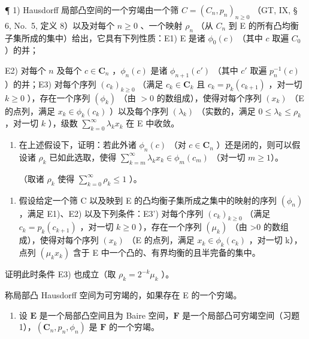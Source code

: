 \exercisegroup

¶ 1) Hausdorff 局部凸空间的一个穷竭由一个筛 \(C = (C_n, p_n)_{n \geqslant 0}\) （GT, IX, § 6, No.~5, 定义 8）以及对每个 \(n \geqslant 0\) 、一个映射 \(\rho_n\) （从 \(C_n\) 到 E 的所有凸均衡子集所成的集中）给出，它具有下列性质：E1) E 是诸 \(\phi_0(c)\) （其中 \(c\) 取遍 \(C_0\) ）的并；

E2) 对每个 \(n\) 及每个 \(c \in \mathbf{C}_n\) ，\(\phi_n(c)\) 是诸 \(\phi_{n+1}(c')\) （其中 \(c'\) 取遍 \(p_n^{-1}(c)\) ）的并；E3) 对每个序列 \((c_k)_{k \geqslant 0}\) （满足 \(c_k \in \mathbf{C}_k\) 且 \(c_k = p_k(c_{k+1})\) ，对一切 \(k \geqslant 0\) ），存在一个序列 \((\phi_k)\) （由 \(>0\) 的数组成），使得对每个序列 \((x_k)\) （E 的点列，满足 \(x_k \in \phi_k(c_k)\) ）以及每个序列 \((\lambda_k)\) （实数的，满足 \(0 \leqslant \lambda_k \leqslant \rho_k\) ，对一切 \(k\) ），级数 \(\sum_{k=0}^{\infty} \lambda_k x_k\) 在 E 中收敛。

\begin{enumerate}
\def\labelenumi{\alph{enumi})}
\tightlist
\item
  在上述假设下，证明：若此外诸 \(\phi_n(c)\) （对 \(c \in \mathbf{C}_n\) ）还是闭的，则可以假设诸 \(\rho_k\) 已如此选取，使得 \(\sum_{k=m}^{\infty} \lambda_k x_k \in \phi_m(c_m)\) （对一切 \(m \geqslant 1\)）。

（取诸 \(\rho_{k}\) 使得 \(\sum_{k=0}^{\infty} \rho_{k} \leqslant 1\) ）。
\end{enumerate}

\begin{enumerate}
\def\labelenumi{\alph{enumi})}
\setcounter{enumi}{1}
\tightlist
\item
  假设给定一个筛 C 以及映到 E 的凸均衡子集所成之集中的映射的序列 \((\phi_{n})\) ，满足 E1)、E2) 以及下列条件：E3') 对每个序列 \((c_{k})_{k\geq0}\) （满足 \(c_{k}=p_{k}(c_{k+1})\) ，对一切 \(k\geq0\) ），存在一个序列 \((\mu_{k})\) （由 \textgreater0 的数组成），使得对每个序列 \((x_{k})\) （E 的点列，满足 \(x_{k}\in\phi_{k}(c_{k})\) ，对一切 k），点列 \((\mu_{k}x_{k})\) 含于 E 中一个凸的、有界均衡的且半完备的集中。
\end{enumerate}

证明此时条件 E3) 也成立（取 \(\rho_{k} = 2^{-k}\mu_{k}\) ）。

称局部凸 Hausdorff 空间为可穷竭的，如果存在 E 的一个穷竭。

\begin{enumerate}
\def\labelenumi{\arabic{enumi})}
\setcounter{enumi}{1}
\tightlist
\item
  设 \(\mathbf{E}\) 是一个局部凸空间且为 Baire 空间，\(\mathbf{F}\) 是一个局部凸可穷竭空间（习题 1），\((\mathbf{C}_n, p_n, \phi_n)\) 是 \(\mathbf{F}\) 的一个穷竭。
\end{enumerate}

